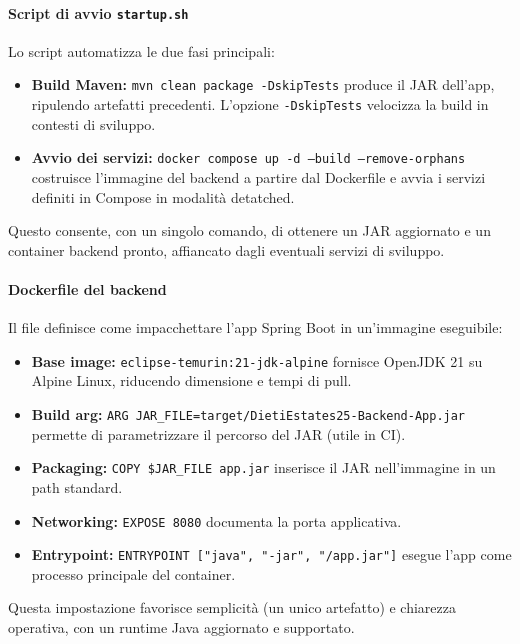 \paragraph{Script di avvio \texttt{startup.sh}}
Lo script  automatizza le due fasi principali:
\begin{itemize}
    \item \textbf{Build Maven:} \texttt{mvn clean package -DskipTests} produce il JAR dell'app, ripulendo artefatti precedenti. L'opzione \texttt{-DskipTests} velocizza la build in contesti di sviluppo.
    \item \textbf{Avvio dei servizi:} \texttt{docker compose up -d --build --remove-orphans} costruisce l'immagine del backend a partire dal Dockerfile e avvia i servizi definiti in Compose in modalità detatched.
\end{itemize}
Questo consente, con un singolo comando, di ottenere un JAR aggiornato e un container backend pronto, affiancato dagli eventuali servizi di sviluppo.

\paragraph{Dockerfile del backend}
Il file  definisce come impacchettare l'app Spring Boot in un'immagine eseguibile:
\begin{itemize}
    \item \textbf{Base image:} \texttt{eclipse-temurin:21-jdk-alpine} fornisce OpenJDK 21 su Alpine Linux, riducendo dimensione e tempi di pull.
    \item \textbf{Build arg:} \texttt{ARG JAR\_FILE=target/DietiEstates25-Backend-App.jar} permette di parametrizzare il percorso del JAR (utile in CI).
    \item \textbf{Packaging:} \texttt{COPY \${JAR\_FILE} app.jar} inserisce il JAR nell'immagine in un path standard.
    \item \textbf{Networking:} \texttt{EXPOSE 8080} documenta la porta applicativa.
    \item \textbf{Entrypoint:} \texttt{ENTRYPOINT ["java", "-jar", "/app.jar"]} esegue l'app come processo principale del container.
\end{itemize}
Questa impostazione favorisce semplicità (un unico artefatto) e chiarezza operativa, con un runtime Java aggiornato e supportato.

